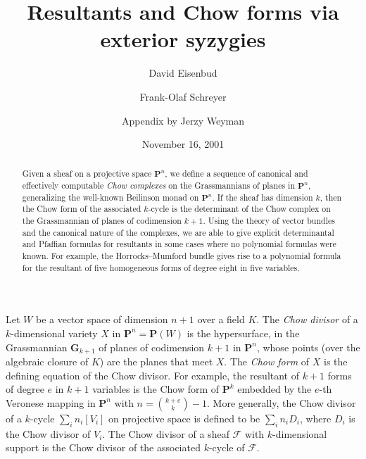 \documentclass{jams-l}
\theoremstyle{definition}
\theoremstyle{remark}
\newcommand{\F}{{\mathcal F}}
\newcommand{\GG}{{\mathbf G}}
\begin{document}
\title{Resultants and Chow forms via exterior syzygies}

\author[David Eisenbud and Frank-Olaf Schreyer]{David Eisenbud}
\address{Department of Mathematics, University of California, Berkeley,
Berkeley, California 94720}

\author[]{Frank-Olaf Schreyer}
\address{Mathematik und Informatik, Geb.\ 27,
Universit\"at des Saarlandes,
D-66123 Saar\-br\"ucken,
Germany}

\author[]{Appendix by Jerzy Weyman}
\address{Department of Mathematics, Northeastern
University, Boston, Massachusetts 02115}

\date{November 16, 2001}



\begin{abstract}
Given a sheaf on a projective space ${\mathbf P}^n$,
we define a sequence of canonical and effectively 
computable {\it Chow
complexes\/} on the Grassmannians of planes in ${\mathbf P}^n$, generalizing
the well-known Beilinson monad on ${\mathbf P}^n$. If the sheaf has
dimension $k$, then the Chow form of the associated $k$-cycle is the
determinant of the Chow complex on the Grassmannian of planes of
codimension $k+1$.  Using the theory of vector bundles and the
canonical nature of the complexes, we are able to give explicit
determinantal and Pfaffian formulas for resultants in some cases where no
polynomial formulas were known. For example, the Horrocks--Mumford
bundle gives rise to a polynomial formula for the resultant of five
homogeneous forms of degree eight in five variables.
\end{abstract}
\maketitle

Let $W$ be a vector space of dimension $n+1$ over a field $K$. The {\it Chow
divisor\/} of a $k$-dimensional variety $X$ in ${\mathbf P}^n={\mathbf P}(W )$
is the
hypersurface, in the Grassmannian $\GG_{k+1}$ of planes of codimension $k+1$ in
${\mathbf P}^n$, 
whose points (over the algebraic closure of $K$) are the planes that
meet $X$. The {\it Chow form} of $X$ is the defining equation of the Chow
divisor. For example, the resultant of $k+1$ forms of degree $e$ in $k+1$
variables is the Chow form of ${\mathbf P}^{k}$ 
embedded by the $e$-th Veronese mapping
in ${\mathbf P}^n$ 
with $n={k+e\choose k} -1$. More generally, the Chow divisor of a
$k$-cycle $\sum_i n_i [V_i]$ on projective space is defined to be $\sum_i n_i
D_i$, where $D_i$ is the Chow divisor of $V_i$. The Chow divisor of a sheaf
$\F$ with $k$-dimensional support is the Chow divisor of the associated
$k$-cycle of $\F$.
\end{document}
